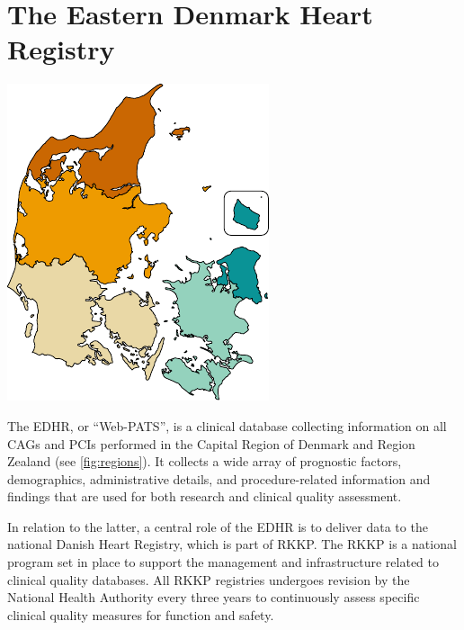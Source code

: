\section{The Eastern Denmark Heart Registry}

\begin{marginfigure}
    \centering
	\includegraphics{graphics/regions}
    \caption[Regions of Denmark]{%
        The five administrative regions of Denmark,
        each in charge of the regional hospitals,
        are: (\,\,) {the Capital Region of Denmark},
        (\,\,) {Region Zealand},
        (\,\,) {Region of Southern Denmark},
        (\,\,) {Central Denmark Region}, and
        (\,\,) {Northern Denmark Region}
        \vspace{1em}
    }
    \label{fig:regions}
\end{marginfigure}

The \ac{EDHR}, or \enquote{Web-PATS}, is a clinical database collecting
information on all \acp{CAG} and \acp{PCI} performed in the Capital
Region of Denmark and Region Zealand (see \cref{fig:regions}).
It collects a wide array of prognostic factors, 
demographics, administrative details, 
and procedure-related information and findings
that are used for both research and clinical quality assessment.
~\autocite{ozcanDanish2016}

In relation to the latter, a central role of the \ac{EDHR} is 
to deliver data to the national Danish Heart Registry, 
which is part of \ac{RKKP}. 
The \ac{RKKP} is a national program set in place to support the
management and infrastructure related to clinical quality databases.
All \ac{RKKP} registries undergoes revision by the National Health Authority
every three years to continuously assess specific 
clinical quality measures for function and safety.
~\autocite{Danish}

